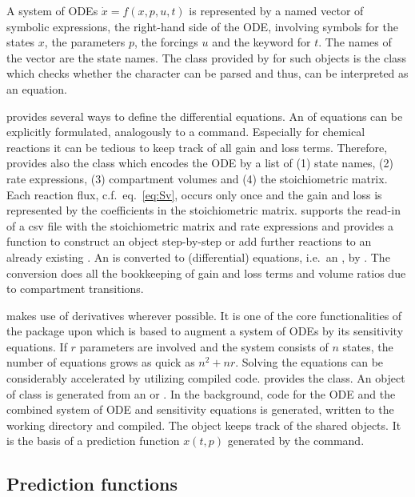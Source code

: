 \documentclass[article]{jss}
\begin{document}
A system of ODEs $\dot x = f(x, p, u, t)$ is represented by a named  vector of symbolic expressions, the right-hand side of the ODE, involving symbols for the states $x$, the parameters $p$, the forcings $u$ and the keyword  for $t$. The names of the vector are the state names. The class provided by  for such objects is the  class which checks whether the character can be parsed and thus, can be interpreted as an equation.

 provides several ways to define the differential equations. An  of equations can be explicitly formulated, analogously to a  command. Especially for chemical reactions it can be tedious to keep track of all gain and loss terms. Therefore,  provides also the  class which encodes the ODE by a list of (1) state names, (2) rate expressions, (3) compartment volumes and (4) the stoichiometric matrix. Each reaction flux, c.f.~eq.~\eqref{eq:Sv}, occurs only once and the gain and loss is represented by the coefficients in the stoichiometric matrix.  supports the read-in of a csv file with the stoichiometric matrix and rate expressions and provides a function  to construct an  object step-by-step or add further reactions to an already existing . An  is converted to (differential) equations, i.e.~an , by . The conversion does all the bookkeeping of gain and loss terms and volume ratios due to compartment transitions.

 makes use of derivatives wherever possible. It is one of the core functionalities of the  package \citep{cOde} upon which  is based to augment a system of ODEs by its sensitivity equations. If $r$ parameters are involved and the system consists of $n$ states, the number of equations grows as quick as $n^2 + nr$. Solving the equations can be considerably accelerated by utilizing compiled code.  provides the  class. An object of class  is generated from an  or . In the background,  code for the ODE and the combined system of ODE and sensitivity equations is generated, written to the working directory and compiled. The  object keeps track of the shared objects. It is the basis of a prediction function $x(t, p)$ generated by the  command.

\subsection{Prediction functions}
\end{document}
